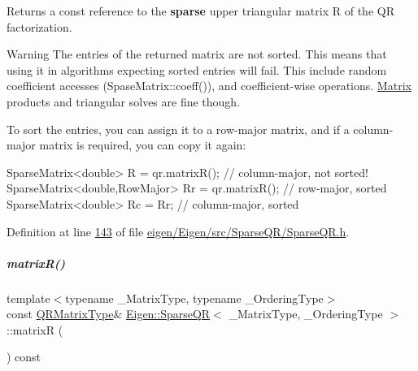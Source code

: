 \begin{DoxyReturn}{Returns}
a const reference to the {\bfseries sparse} upper triangular matrix R of the QR factorization. 
\end{DoxyReturn}
\begin{DoxyWarning}{Warning}
The entries of the returned matrix are not sorted. This means that using it in algorithms expecting sorted entries will fail. This include random coefficient accesses (Spase\+Matrix\+::coeff()), and coefficient-\/wise operations. \hyperlink{group___core___module_class_eigen_1_1_matrix}{Matrix} products and triangular solves are fine though.
\end{DoxyWarning}
To sort the entries, you can assign it to a row-\/major matrix, and if a column-\/major matrix is required, you can copy it again\+: 
\begin{DoxyCode}
SparseMatrix<double>          R  = qr.matrixR();  \textcolor{comment}{// column-major, not sorted!}
SparseMatrix<double,RowMajor> Rr = qr.matrixR();  \textcolor{comment}{// row-major, sorted}
SparseMatrix<double>          Rc = Rr;            \textcolor{comment}{// column-major, sorted}
\end{DoxyCode}
 

Definition at line \hyperlink{eigen_2_eigen_2src_2_sparse_q_r_2_sparse_q_r_8h_source_l00143}{143} of file \hyperlink{eigen_2_eigen_2src_2_sparse_q_r_2_sparse_q_r_8h_source}{eigen/\+Eigen/src/\+Sparse\+Q\+R/\+Sparse\+Q\+R.\+h}.

\mbox{\label{group___sparse_q_r___module_a564524ff13b2b6dd1e76127404f7b920}} 
\subparagraph{\texorpdfstring{matrix\+R()}{matrixR()}\hspace{0.1cm}{\footnotesize\ttfamily [2/2]}}
{\footnotesize\ttfamily template$<$typename \+\_\+\+Matrix\+Type, typename \+\_\+\+Ordering\+Type$>$ \\
const \hyperlink{group___sparse_core___module}{Q\+R\+Matrix\+Type}\& \hyperlink{group___sparse_q_r___module_class_eigen_1_1_sparse_q_r}{Eigen\+::\+Sparse\+QR}$<$ \+\_\+\+Matrix\+Type, \+\_\+\+Ordering\+Type $>$\+::matrixR (\begin{DoxyParamCaption}{ }\end{DoxyParamCaption}) const\hspace{0.3cm}{\ttfamily [inline]}}

